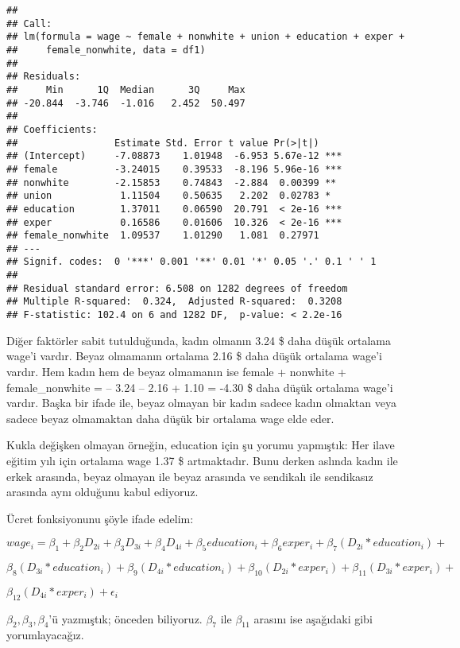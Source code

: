 \documentclass[
]{book}
\begin{document}
\begin{verbatim}
## 
## Call:
## lm(formula = wage ~ female + nonwhite + union + education + exper + 
##     female_nonwhite, data = df1)
## 
## Residuals:
##     Min      1Q  Median      3Q     Max 
## -20.844  -3.746  -1.016   2.452  50.497 
## 
## Coefficients:
##                 Estimate Std. Error t value Pr(>|t|)    
## (Intercept)     -7.08873    1.01948  -6.953 5.67e-12 ***
## female          -3.24015    0.39533  -8.196 5.96e-16 ***
## nonwhite        -2.15853    0.74843  -2.884  0.00399 ** 
## union            1.11504    0.50635   2.202  0.02783 *  
## education        1.37011    0.06590  20.791  < 2e-16 ***
## exper            0.16586    0.01606  10.326  < 2e-16 ***
## female_nonwhite  1.09537    1.01290   1.081  0.27971    
## ---
## Signif. codes:  0 '***' 0.001 '**' 0.01 '*' 0.05 '.' 0.1 ' ' 1
## 
## Residual standard error: 6.508 on 1282 degrees of freedom
## Multiple R-squared:  0.324,  Adjusted R-squared:  0.3208 
## F-statistic: 102.4 on 6 and 1282 DF,  p-value: < 2.2e-16
\end{verbatim}

Diğer faktörler sabit tutulduğunda, kadın olmanın 3.24 \$ daha düşük ortalama wage'i vardır. Beyaz olmamanın ortalama 2.16 \$ daha düşük ortalama wage'i vardır. Hem kadın hem de beyaz olmamanın ise female + nonwhite + female\_nonwhite = -- 3.24 -- 2.16 + 1.10 = -4.30 \$ daha düşük ortalama wage'i vardır. Başka bir ifade ile, beyaz olmayan bir kadın sadece kadın olmaktan veya sadece beyaz olmamaktan daha düşük bir ortalama wage elde eder.

Kukla değişken olmayan örneğin, education için şu yorumu yapmıştık: Her ilave eğitim yılı için ortalama wage 1.37 \$ artmaktadır. Bunu derken aslında kadın ile erkek arasında, beyaz olmayan ile beyaz arasında ve sendikalı ile sendikasız arasında aynı olduğunu kabul ediyoruz.

Ücret fonksiyonunu şöyle ifade edelim:

\(wage_i = \beta_1 + \beta_2D_{2i} + \beta_3D_{3i} + \beta_4D_{4i} + \beta_5education_i + \beta_6exper_i + \beta_7(D_{2i}*education_i) +\)

\(\beta_8(D_{3i}*education_i) + \beta_9(D_{4i}*education_i) + \beta_{10}(D_{2i}*exper_i) + \beta_{11}(D_{3i}*exper_i) +\)

\(\beta_{12}(D_{4i}*exper_i) + \epsilon_i\)

\(\beta_2, \beta_3, \beta_4\)'ü yazmıştık; önceden biliyoruz. \(\beta_7\) ile \(\beta_{11}\) arasını ise aşağıdaki gibi yorumlayacağız.
\end{document}
